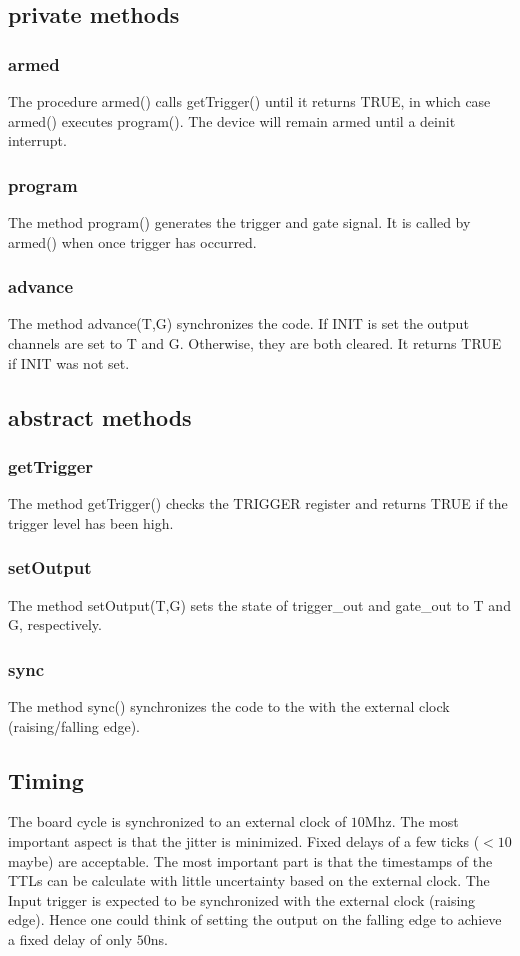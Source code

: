 \documentclass{article}
\begin{document}
\subsection*{private methods}
\subsubsection*{armed}
The procedure armed() calls getTrigger() until it returns TRUE, in which case armed() executes program(). The device will remain armed until a deinit interrupt.
\subsubsection*{program}
The method program() generates the trigger and gate signal. It is called by armed() when once trigger has occurred.
\subsubsection*{advance}
The method advance(T,G) synchronizes the code. If INIT is set the output channels are set to T and G. Otherwise, they are both cleared. It returns TRUE if INIT was not set.
\subsection*{abstract methods}
\subsubsection*{getTrigger}
The method getTrigger() checks the TRIGGER register and returns TRUE if the trigger level has been high.
\subsubsection*{setOutput}
The method setOutput(T,G) sets the state of trigger\_out and gate\_out to T and G, respectively.
\subsubsection*{sync}
The method sync() synchronizes the code to the with the external clock (raising/falling edge).

\subsection*{Timing}
The board cycle is synchronized to an external clock of $10$Mhz.
The most important aspect is that the jitter is minimized. Fixed delays of a few ticks ($<10$ maybe) are acceptable. The most important part is that the timestamps of the TTLs can be calculate with little uncertainty based on the external clock. The Input trigger is expected to be synchronized with the external clock (raising edge). Hence one could think of setting the output on the falling edge to achieve a fixed delay of only $50$ns.
\end{document}
